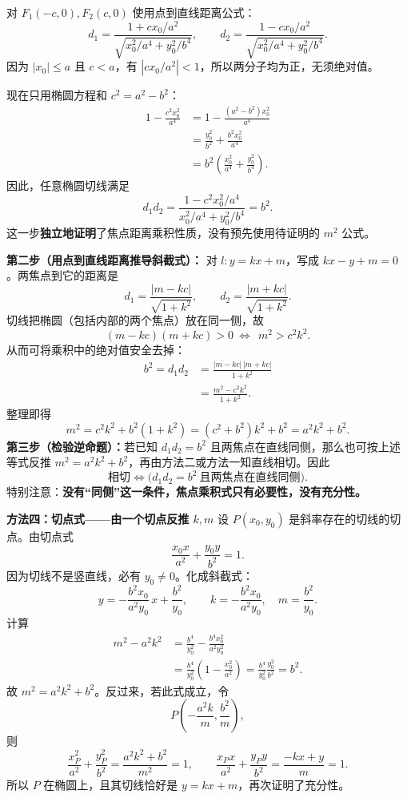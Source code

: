\begin{proofbox}
对 $F_1(-c,0),F_2(c,0)$ 使用点到直线距离公式：
\[
 d_1=\frac{1+cx_0/a^2}{\sqrt{x_0^2/a^4+y_0^2/b^4}},\qquad
 d_2=\frac{1-cx_0/a^2}{\sqrt{x_0^2/a^4+y_0^2/b^4}}.
\]
因为 $|x_0|\le a$ 且 $c<a$，有 $|cx_0/a^2|<1$，所以两分子均为正，无须绝对值。

现在只用椭圆方程和 $c^2=a^2-b^2$：
\[
\begin{aligned}
 1-\frac{c^2x_0^2}{a^4}
 &=1-\frac{(a^2-b^2)x_0^2}{a^4}\\
 &=\frac{y_0^2}{b^2}+\frac{b^2x_0^2}{a^4}\\
 &=b^2\left(\frac{x_0^2}{a^4}+\frac{y_0^2}{b^4}\right).
\end{aligned}
\]
因此，任意椭圆切线满足
\[
\boxed{d_1d_2
 =\frac{1-c^2x_0^2/a^4}{x_0^2/a^4+y_0^2/b^4}=b^2.}
\]
这一步\textbf{独立地证明}了焦点距离乘积性质，没有预先使用待证明的 $m^2$ 公式。

\textbf{第二步（用点到直线距离推导斜截式）：}
对 $l:y=kx+m$，写成 $kx-y+m=0$。两焦点到它的距离是
\[
 d_1=\frac{|m-kc|}{\sqrt{1+k^2}},\qquad
 d_2=\frac{|m+kc|}{\sqrt{1+k^2}}.
\]
切线把椭圆（包括内部的两个焦点）放在同一侧，故
\[
 (m-kc)(m+kc)>0
 \ \Longleftrightarrow\ \ m^2>c^2k^2.
\]
从而可将乘积中的绝对值安全去掉：
\[
\begin{aligned}
 b^2=d_1d_2
 &=\frac{|m-kc|\,|m+kc|}{1+k^2}\\
 &=\frac{m^2-c^2k^2}{1+k^2}.
\end{aligned}
\]
整理即得
\[
 \boxed{m^2=c^2k^2+b^2(1+k^2)
 =(c^2+b^2)k^2+b^2=a^2k^2+b^2.}
\]
\textbf{第三步（检验逆命题）：}若已知 $d_1d_2=b^2$ 且两焦点在直线同侧，那么也可按上述等式反推 $m^2=a^2k^2+b^2$，再由方法二或方法一知直线相切。因此
\[
 \boxed{\text{相切}\iff
 \bigl(d_1d_2=b^2\ \text{且两焦点在直线同侧}\bigr).}
\]
特别注意：\textbf{没有“同侧”这一条件，焦点乘积式只有必要性，没有充分性。}

\medskip
\textbf{\textcolor{CProof}{方法四：切点式——由一个切点反推 $k,m$}}
设 $P(x_0,y_0)$ 是斜率存在的切线的切点。由切点式
\[
 \frac{x_0x}{a^2}+\frac{y_0y}{b^2}=1.
\]
因为切线不是竖直线，必有 $y_0\ne0$。化成斜截式：
\[
 y=-\frac{b^2x_0}{a^2y_0}\,x+\frac{b^2}{y_0},
 \qquad k=-\frac{b^2x_0}{a^2y_0},\quad m=\frac{b^2}{y_0}.
\]
计算
\[
\begin{aligned}
 m^2-a^2k^2
 &=\frac{b^4}{y_0^2}-\frac{b^4x_0^2}{a^2y_0^2}\\
 &=\frac{b^4}{y_0^2}\left(1-\frac{x_0^2}{a^2}\right)
 =\frac{b^4}{y_0^2}\frac{y_0^2}{b^2}=b^2.
\end{aligned}
\]
故 $m^2=a^2k^2+b^2$。反过来，若此式成立，令
\[
 P\left(-\frac{a^2k}{m},\frac{b^2}{m}\right),
\]
则
\[
 \frac{x_P^2}{a^2}+\frac{y_P^2}{b^2}
 =\frac{a^2k^2+b^2}{m^2}=1,
 \qquad
 \frac{x_Px}{a^2}+\frac{y_Py}{b^2}
 =\frac{-kx+y}{m}=1.
\]
所以 $P$ 在椭圆上，且其切线恰好是 $y=kx+m$，再次证明了充分性。


\end{proofbox}

